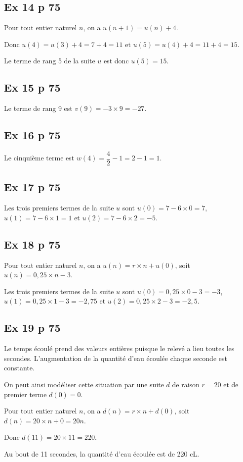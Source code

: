 \documentclass[12pt,a4paper]{book}
\begin{document}
\subsection*{Ex 14 p 75}

Pour tout entier naturel $n$, on a $u\left(n+1\right)=u\left(n\right)+4$.

Donc $u\left(4\right)=u\left(3\right)+4=7+4=11$ et $u\left(5\right)=u\left(4\right)+4=11+4=15$.

Le terme de rang 5 de la suite $u$ est donc $u\left(5\right)=15$.

\subsection*{Ex 15 p 75}

Le terme de rang 9 est $v\left(9\right)=-3 \times 9=-27$.

\subsection*{Ex 16 p 75}

Le cinquième terme est $w\left(4\right)=\dfrac{4}{2}-1=2-1=1$.

\subsection*{Ex 17 p 75}

Les trois premiers termes de la suite $u$ sont $u\left(0\right)=7-6\times 0=7$, $u\left(1\right)=7-6\times 1=1$ et $u\left(2\right)=7-6\times 2=-5$.

\subsection*{Ex 18 p 75}

Pour tout entier naturel $n$, on a $u\left(n\right)=r \times n + u\left(0\right)$, soit $u\left(n\right)=0,25 \times n -3$.

Les trois premiers termes de la suite $u$ sont $u\left(0\right)=0,25 \times 0 -3=-3$, $u\left(1\right)=0,25 \times 1 -3=-2,75$ et $u\left(2\right)=0,25 \times 2 -3=-2,5$.

\subsection*{Ex 19 p 75}


\begin{enumMet}
	\item Le temps écoulé prend des valeurs entières puisque le relevé a lieu toutes les secondes. L’augmentation de la quantité d’eau écoulée chaque seconde est constante.
	
	On peut ainsi modéliser cette situation par une suite $d$ de raison $r=20$ et de premier terme $d\left(0\right)=0$.
	\item Pour tout entier naturel $n$, on a $d\left(n\right)=r \times n + d\left(0\right)$, soit $d\left(n\right)=20 \times n +0=20n$.
	
	Donc $d\left(11\right)=20 \times 11=220$.
	
	Au bout de 11 secondes, la quantité d’eau écoulée est de 220 cL.
\end{enumMet}
\end{document}
